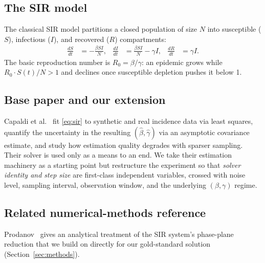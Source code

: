 \subsection{The SIR model}
The classical SIR model partitions a closed population of size $N$ into susceptible ($S$),
infectious ($I$), and recovered ($R$) compartments:
\begin{align}
  \frac{dS}{dt} &= -\frac{\beta S I}{N}, &
  \frac{dI}{dt} &= \frac{\beta S I}{N} - \gamma I, &
  \frac{dR}{dt} &= \gamma I. \label{eq:sir}
\end{align}
The basic reproduction number is $R_0 = \beta/\gamma$: an epidemic grows while $R_0 \cdot S(t)/N > 1$
and declines once susceptible depletion pushes it below 1.

\subsection{Base paper and our extension}
Capaldi et al.~\cite{capaldi2012} fit \eqref{eq:sir} to synthetic and real incidence data via
least squares, quantify the uncertainty in the resulting $(\hat\beta,\hat\gamma)$ via an asymptotic
covariance estimate, and study how estimation quality degrades with sparser sampling. Their solver
is used only as a means to an end. We take their estimation machinery as a starting point but
restructure the experiment so that \emph{solver identity and step size} are first-class independent
variables, crossed with noise level, sampling interval, observation window, and the underlying
$(\beta,\gamma)$ regime.

\subsection{Related numerical-methods reference}
Prodanov~\cite{prodanov2021} gives an analytical treatment of the SIR system's phase-plane
reduction that we build on directly for our gold-standard solution (Section~\ref{sec:methods}).
